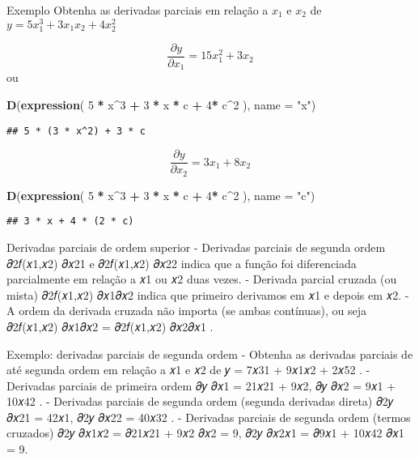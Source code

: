 \documentclass[
]{article}
\newenvironment{Shaded}{\begin{snugshade}}{\end{snugshade}}
\newcommand{\AttributeTok}[1]{\textcolor[rgb]{0.13,0.29,0.53}{#1}}
\newcommand{\DecValTok}[1]{\textcolor[rgb]{0.00,0.00,0.81}{#1}}
\newcommand{\FunctionTok}[1]{\textcolor[rgb]{0.13,0.29,0.53}{\textbf{#1}}}
\newcommand{\NormalTok}[1]{#1}
\newcommand{\SpecialCharTok}[1]{\textcolor[rgb]{0.81,0.36,0.00}{\textbf{#1}}}
\newcommand{\StringTok}[1]{\textcolor[rgb]{0.31,0.60,0.02}{#1}}
\begin{document}
Exemplo Obtenha as derivadas parciais em relação a \(x_{1}\) e \(x_{2}\)
de \(y = 5 x_{1}^{3} + 3 x_{1} x_{2} + 4 x_{2}^{2}\)

\[\displaystyle \frac{\partial y}{\partial x_{1}} = 15 x_{1}^{2} + 3 x_{2}\]
ou

\begin{Shaded}
\begin{Highlighting}[]
\FunctionTok{D}\NormalTok{(}\FunctionTok{expression}\NormalTok{( }\DecValTok{5} \SpecialCharTok{*}\NormalTok{ x}\SpecialCharTok{\^{}}\DecValTok{3} \SpecialCharTok{+} \DecValTok{3} \SpecialCharTok{*}\NormalTok{ x }\SpecialCharTok{*}\NormalTok{ c }\SpecialCharTok{+} \DecValTok{4}\SpecialCharTok{*}\NormalTok{ c}\SpecialCharTok{\^{}}\DecValTok{2}\NormalTok{ ), }\AttributeTok{name =} \StringTok{"x"}\NormalTok{)}
\end{Highlighting}
\end{Shaded}

\begin{verbatim}
## 5 * (3 * x^2) + 3 * c
\end{verbatim}

\[\displaystyle \frac{\partial y}{\partial x_{2}} = 3 x_{1} + 8 x_{2}\]

\begin{Shaded}
\begin{Highlighting}[]
\FunctionTok{D}\NormalTok{(}\FunctionTok{expression}\NormalTok{( }\DecValTok{5} \SpecialCharTok{*}\NormalTok{ x}\SpecialCharTok{\^{}}\DecValTok{3} \SpecialCharTok{+} \DecValTok{3} \SpecialCharTok{*}\NormalTok{ x }\SpecialCharTok{*}\NormalTok{ c }\SpecialCharTok{+} \DecValTok{4}\SpecialCharTok{*}\NormalTok{ c}\SpecialCharTok{\^{}}\DecValTok{2}\NormalTok{ ), }\AttributeTok{name =} \StringTok{"c"}\NormalTok{)}
\end{Highlighting}
\end{Shaded}

\begin{verbatim}
## 3 * x + 4 * (2 * c)
\end{verbatim}

Derivadas parciais de ordem superior - Derivadas parciais de segunda
ordem 𝜕2𝑓(𝑥1,𝑥2) 𝜕𝑥21 e 𝜕2𝑓(𝑥1,𝑥2) 𝜕𝑥22 indica que a função foi
diferenciada parcialmente em relação a 𝑥1 ou 𝑥2 duas vezes. - Derivada
parcial cruzada (ou mista) 𝜕2𝑓(𝑥1,𝑥2) 𝜕𝑥1𝜕𝑥2 indica que primeiro
derivamos em 𝑥1 e depois em 𝑥2. - A ordem da derivada cruzada não
importa (se ambas contínuas), ou seja 𝜕2𝑓(𝑥1,𝑥2) 𝜕𝑥1𝜕𝑥2 = 𝜕2𝑓(𝑥1,𝑥2)
𝜕𝑥2𝜕𝑥1 .

Exemplo: derivadas parciais de segunda ordem - Obtenha as derivadas
parciais de até segunda ordem em relação a 𝑥1 e 𝑥2 de 𝑦 = 7𝑥31 + 9𝑥1𝑥2 +
2𝑥52 . - Derivadas parciais de primeira ordem 𝜕𝑦 𝜕𝑥1 = 21𝑥21 + 9𝑥2, 𝜕𝑦
𝜕𝑥2 = 9𝑥1 + 10𝑥42 . - Derivadas parciais de segunda ordem (segunda
derivadas direta) 𝜕2𝑦 𝜕𝑥21 = 42𝑥1, 𝜕2𝑦 𝜕𝑥22 = 40𝑥32 . - Derivadas
parciais de segunda ordem (termos cruzados) 𝜕2𝑦 𝜕𝑥1𝑥2 = 𝜕21𝑥21 + 9𝑥2 𝜕𝑥2
= 9, 𝜕2𝑦 𝜕𝑥2𝑥1 = 𝜕9𝑥1 + 10𝑥42 𝜕𝑥1 = 9.
\end{document}
